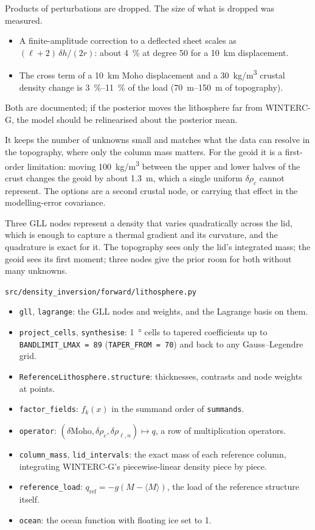 Products of perturbations are dropped.
The size of what is dropped was measured.
\begin{itemize}[nosep]
\item A finite-amplitude correction to a deflected sheet scales as $(\ell+2)\,\delta h/(2r)$: about \qty{4}{\percent} at degree 50 for a \qty{10}{km} displacement.
\item The cross term of a \qty{10}{km} Moho displacement and a \qty{30}{kg/m^3} crustal density change is \qtyrange{3}{11}{\percent} of the load (\qtyrange{70}{150}{m} of topography).
\end{itemize}
Both are documented; if the posterior moves the lithosphere far from WINTERC-G, the model should be relinearised about the posterior mean.

\begin{defence}
\A It keeps the number of unknowns small and matches what the data can resolve in the topography, where only the column mass matters.
For the geoid it is a first-order limitation: moving \qty{100}{kg/m^3} between the upper and lower halves of the crust changes the geoid by about \qty{1.3}{m}, which a single uniform $\delta\rho_c$ cannot represent.
The options are a second crustal node, or carrying that effect in the modelling-error covariance.

\A Three GLL nodes represent a density that varies quadratically across the lid, which is enough to capture a thermal gradient and its curvature, and the quadrature is exact for it.
The topography sees only the lid's integrated mass; the geoid sees its first moment; three nodes give the prior room for both without many unknowns.
\end{defence}

\begin{incode}{\texttt{src/density\_inversion/forward/lithosphere.py}}
\begin{itemize}[nosep]
\item \texttt{gll}, \texttt{lagrange}: the GLL nodes and weights, and the Lagrange basis on them.
\item \texttt{project\_cells}, \texttt{synthesise}: \qty{1}{\degree} cells to tapered coefficients up to \texttt{BANDLIMIT\_LMAX = 89} (\texttt{TAPER\_FROM = 70}) and back to any Gauss--Legendre grid.
\item \texttt{ReferenceLithosphere.structure}: thicknesses, contrasts and node weights at points.
\item \texttt{factor\_fields}: $f_k(x)$ in the summand order of \texttt{summands}.
\item \texttt{operator}: $(\delta\mathrm{Moho}, \delta\rho_c, \delta\rho_{\ell,n}) \mapsto q$, a row of multiplication operators.
\item \texttt{column\_mass}, \texttt{lid\_intervals}: the exact mass of each reference column, integrating WINTERC-G's piecewise-linear density piece by piece.
\item \texttt{reference\_load}: $q_{\mathrm{ref}} = -g(M - \langle M\rangle)$, the load of the reference structure itself.
\item \texttt{ocean}: the ocean function with floating ice set to 1.
\end{itemize}
\end{incode}
